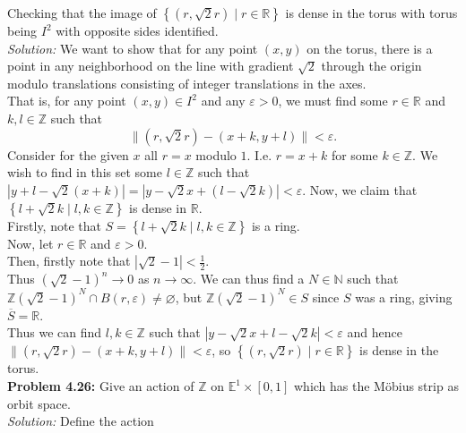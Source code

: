 \documentclass[a4paper]{article}
\begin{document}
    Checking that the image of 
    $\left\{ (r, \sqrt{2} r)  \mid r \in \mathbb{R} \right\} $ 
    is dense in the torus with torus being $I^2$ with opposite sides
    identified.\\
    \linebreak
    \textit{Solution:}
    We want to show that for any point $(x,y)$ on the torus,
    there is a point in any neighborhood on the line
    with gradient $\sqrt{2} $ through the origin modulo translations
    consisting of integer translations in the axes.\\
    That is, for any point  $(x,y) \in I^2$ and
    any $\varepsilon > 0$, we must find some $r \in \mathbb{R}$ and
    $k,l \in \mathbb{Z}$ such that
    \[
        \| (r, \sqrt{2} r) - (x + k, y+ l)  \|
        < \varepsilon.
    \] 
    Consider for the given $x$ all
    $r = x$  modulo $1$. I.e.
    $r = x+k$ for some $k \in \mathbb{Z}$. We wish to find
    in this set some $l \in \mathbb{Z}$ such that
    $ | y + l - \sqrt{2} (x+k)| = |y - \sqrt{2} x + (l - \sqrt{2} k)|
    < \varepsilon$. 
    Now, we claim that
    $\left\{ l + \sqrt{2} k  \mid l,k \in \mathbb{Z} \right\} $ is dense in
    $\mathbb{R}$.\\
    Firstly, note that
    $S = \left\{ l + \sqrt{2} k \mid l,k \in \mathbb{Z} \right\} $ is a ring.\\
    Now, let $r \in \mathbb{R}$ and $\varepsilon > 0$.\\
    Then, firstly note that $ \left| \sqrt{2} -1 \right| < \frac{1}{2}$.\\
    Thus $(\sqrt{2} -1)^{n} \to 0$ as $n \to \infty$.
    We can thus find a $N \in \mathbb{N}$ such that
    $\mathbb{Z} \left( \sqrt{2} -1 \right)^{N} \cap B(r, \varepsilon) \neq
    \varnothing$, but $\mathbb{Z} \left( \sqrt{2} -1 \right)^{N} \in S$ since
    $S$ was a ring, giving $\overline{S} = \mathbb{R}$.\\
    Thus we can find $l, k \in \mathbb{Z}$ such that
    $\left| y - \sqrt{2} x + l - \sqrt{2} k \right| < \varepsilon$ and hence
    $\|(r, \sqrt{2} r) - \left( x+k, y+l \right) \|< \varepsilon$, so
    $\left\{ (r, \sqrt{2} r)  \mid r \in \mathbb{R} \right\} $ is dense in the
    torus.\\
    \linebreak
    \textbf{Problem 4.26:} Give an action of $\mathbb{Z}$ on $\mathbb{E}^{1}
    \times \left[ 0,1 \right] $ which has the Möbius strip as orbit space.\\
    \linebreak
    \textit{Solution:} Define the action
\end{document}
